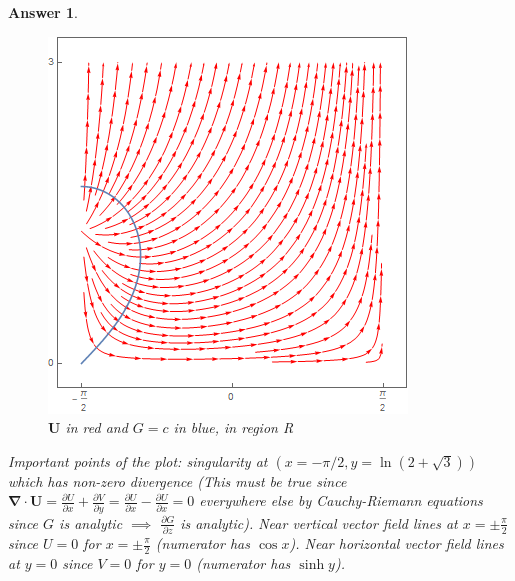 \documentclass[a4paper]{article}
\newtheorem{ans}{Answer}[section]
\theoremstyle{new}
\begin{document}
\begin{ans}
\begin{enumerate}[label=(\alph*)]
\begin{enumerate}[label=(\roman*)]
\begin{figure}[H]
    \centering
    \includegraphics[scale=0.55]{2016P1Q7.png}
    \caption{$\mathbf{U}$ in red and $G=c$ in blue, in region R}
\end{figure}
Important points of the plot: singularity at $(x=-\pi/2,y=\ln(2+\sqrt{3}))$ which has non-zero divergence (This must be true since $\boldsymbol{\nabla}\cdot\mathbf{U}=\frac{\partial U}{\partial x}+\frac{\partial V}{\partial y}=\frac{\partial U}{\partial x}-\frac{\partial U}{\partial x}=0$ everywhere else by Cauchy-Riemann equations since $G$ is analytic $\implies$ $\frac{\partial G}{\partial z}$ is analytic). Near vertical vector field lines at $x=\pm\frac{\pi}{2}$ since $U=0$ for $x=\pm\frac{\pi}{2}$ (numerator has $\cos x$). Near horizontal vector field lines at $y=0$ since $V=0$ for $y=0$ (numerator has $\sinh y$).
\end{enumerate}
\end{enumerate}
\end{ans}
\end{document}
